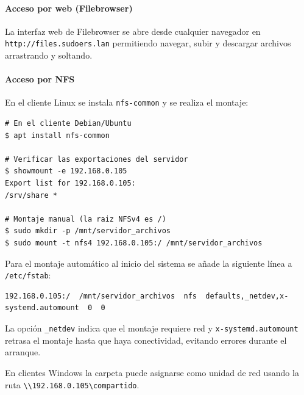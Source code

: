 
\paragraph{Acceso por web (Filebrowser)}

La interfaz web de Filebrowser se abre desde cualquier navegador en
\texttt{http://files.sudoers.lan} permitiendo navegar, subir y descargar
archivos arrastrando y soltando.


\paragraph{Acceso por NFS}

En el cliente Linux se instala \texttt{nfs-common} y se realiza el montaje:

\begin{lstlisting}[style=terminal]
# En el cliente Debian/Ubuntu
$ apt install nfs-common

# Verificar las exportaciones del servidor
$ showmount -e 192.168.0.105
Export list for 192.168.0.105:
/srv/share *

# Montaje manual (la raiz NFSv4 es /)
$ sudo mkdir -p /mnt/servidor_archivos
$ sudo mount -t nfs4 192.168.0.105:/ /mnt/servidor_archivos
\end{lstlisting}

Para el montaje automático al inicio del sistema se añade la siguiente línea a
\texttt{/etc/fstab}:

\begin{lstlisting}[style=terminal]
192.168.0.105:/  /mnt/servidor_archivos  nfs  defaults,_netdev,x-systemd.automount  0  0
\end{lstlisting}

La opción \texttt{\_netdev} indica que el montaje requiere red y
\texttt{x-systemd.automount} retrasa el montaje hasta que haya conectividad,
evitando errores durante el arranque.


En clientes Windows la carpeta puede asignarse como unidad de red usando la
ruta \texttt{\textbackslash{}\textbackslash{}192.168.0.105\textbackslash{}compartido}.
